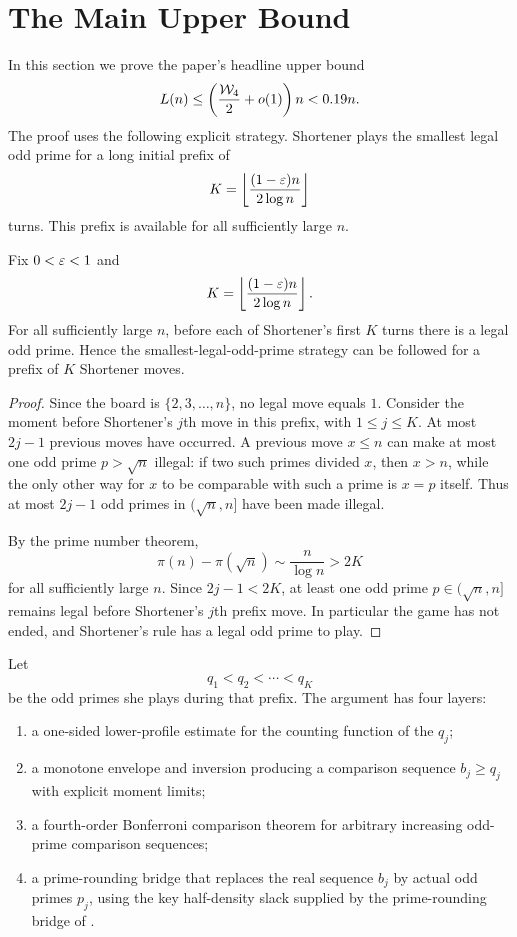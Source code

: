 
\section{The Main Upper Bound}\label{sec:main-upper}

In this section we prove the paper's headline upper bound
\[
  L(n) \le \left(\frac{\mathcal{W}_4}{2}+o(1)\right)n < 0.19n.
\]
The proof uses the following explicit strategy.  Shortener plays the smallest legal odd prime for a long initial prefix of
\[
  K = \left\lfloor \frac{(1-\varepsilon)n}{2\log n}\right\rfloor
\]
turns.  This prefix is available for all sufficiently large $n$.

\begin{lemma}\label{lem:prefix-existence}
Fix $0<\varepsilon<1$ and
\[
  K=\left\lfloor \frac{(1-\varepsilon)n}{2\log n}\right\rfloor.
\]
For all sufficiently large $n$, before each of Shortener's first $K$ turns
there is a legal odd prime.  Hence the smallest-legal-odd-prime strategy can
be followed for a prefix of $K$ Shortener moves.
\end{lemma}

\begin{proof}
Since the board is $\{2,3,\ldots,n\}$, no legal move equals $1$.
Consider the moment before Shortener's $j$th move in this prefix, with
$1\le j\le K$.  At most $2j-1$ previous moves have occurred.  A previous move
$x\le n$ can make at most one odd prime $p>\sqrt n$ illegal: if two such
primes divided $x$, then $x>n$, while the only other way for $x$ to be
comparable with such a prime is $x=p$ itself.  Thus at most $2j-1$ odd primes
in $(\sqrt n,n]$ have been made illegal.

By the prime number theorem,
\[
  \pi(n)-\pi(\sqrt n)\sim \frac{n}{\log n}>2K
\]
for all sufficiently large $n$.  Since $2j-1<2K$, at least one odd prime
$p\in(\sqrt n,n]$ remains legal before Shortener's $j$th prefix move.  In
particular the game has not ended, and Shortener's rule has a legal odd prime
to play.
\end{proof}

Let
\[
  q_1 < q_2 < \cdots < q_K
\]
be the odd primes she plays during that prefix.  The argument has four layers:
\begin{enumerate}
  \item a one-sided lower-profile estimate for the counting function of the $q_j$;
  \item a monotone envelope and inversion producing a comparison sequence
    $b_j \ge q_j$ with explicit moment limits;
  \item a fourth-order Bonferroni comparison theorem for arbitrary increasing
    odd-prime comparison sequences;
  \item a prime-rounding bridge that replaces the real sequence $b_j$ by actual
    odd primes $p_j$, using the key half-density slack supplied by the
    prime-rounding bridge of .
\end{enumerate}

